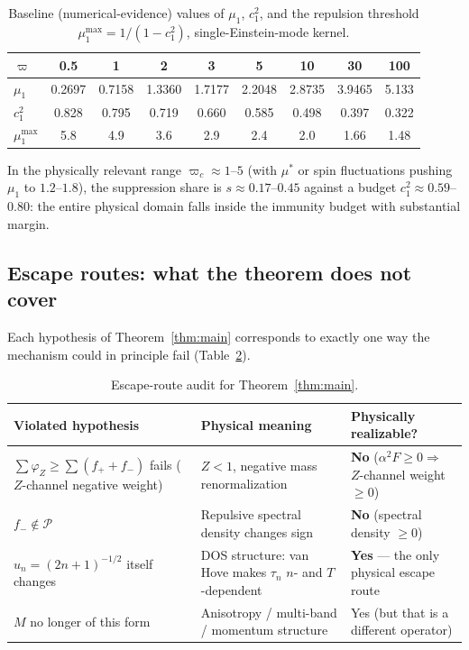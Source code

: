 \documentclass[11pt]{article}
\newcommand{\PP}{\mathcal{P}}
\begin{document}
\begin{table}[h]
\centering
\caption{Baseline (numerical-evidence) values of $\mu_1$, $c_1^2$, and the
repulsion threshold $\mu_1^{\max}=1/(1-c_1^2)$, single-Einstein-mode kernel.}
\label{tab:c1sq-baseline}
\begin{tabular}{lcccccccc}
\toprule
$\varpi$ & 0.5 & 1 & 2 & 3 & 5 & 10 & 30 & 100\\
\midrule
$\mu_1$ & 0.2697 & 0.7158 & 1.3360 & 1.7177 & 2.2048 & 2.8735 & 3.9465 & 5.133\\
$c_1^2$ & 0.828 & 0.795 & 0.719 & 0.660 & 0.585 & 0.498 & 0.397 & 0.322\\
$\mu_1^{\max}$ & 5.8 & 4.9 & 3.6 & 2.9 & 2.4 & 2.0 & 1.66 & 1.48\\
\bottomrule
\end{tabular}
\end{table}

In the physically relevant range $\varpi_c\approx1$--$5$ (with $\mu^*$ or spin
fluctuations pushing $\mu_1$ to $1.2$--$1.8$), the suppression share is
$s\approx0.17$--$0.45$ against a budget $c_1^2\approx0.59$--$0.80$: the entire
physical domain falls inside the immunity budget with substantial margin.

\subsection{Escape routes: what the theorem does not cover}

Each hypothesis of Theorem~\ref{thm:main} corresponds to exactly one way the
mechanism could in principle fail (Table~\ref{tab:escape}).

\begin{table}[h]
\centering
\caption{Escape-route audit for Theorem~\ref{thm:main}.}
\label{tab:escape}
\begin{tabular}{p{4.6cm}p{5cm}p{2.6cm}}
\toprule
Violated hypothesis & Physical meaning & Physically realizable?\\
\midrule
$\sum\varphi_Z\ge\sum(f_++f_-)$ fails ($Z$-channel negative weight) & $Z<1$, negative mass renormalization & \textbf{No} ($\alpha^2F\ge0\Rightarrow$ $Z$-channel weight $\ge0$)\\
$f_-\notin\PP$ & Repulsive spectral density changes sign & \textbf{No} (spectral density $\ge0$)\\
$u_n=(2n+1)^{-1/2}$ itself changes & DOS structure: van Hove makes $\tau_n$ $n$- and $T$-dependent & \textbf{Yes} --- the only physical escape route\\
$M$ no longer of this form & Anisotropy / multi-band / momentum structure & Yes (but that is a different operator)\\
\bottomrule
\end{tabular}
\end{table}
\end{document}
